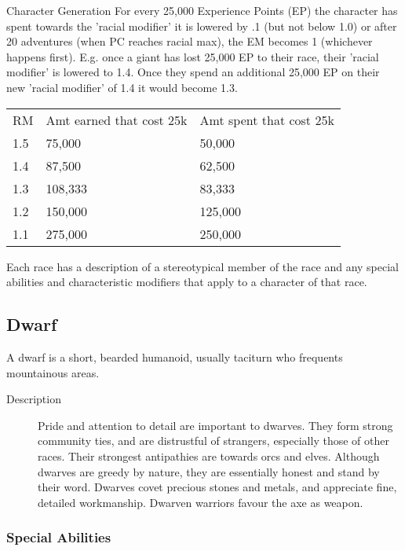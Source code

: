 \begin{Chapter}{Character Generation}
For every 25,000 Experience Points (EP) the character has spent
towards the 'racial modifier' it is lowered by .1 (but not below 1.0)
or after 20 adventures (when PC reaches racial max), the EM becomes 1
(whichever happens first).  E.g. once a giant has lost 25,000 EP to
their race, their 'racial modifier' is lowered to 1.4.  Once they
spend an additional 25,000 EP on their new 'racial modifier' of 1.4 it
would become 1.3.

\begin{tabularx}{\columnwidth}{lXX}
RM	& Amt earned that cost 25k	& Amt spent that cost 25k  \\
1.5	& 75,000			& 50,000 \\
1.4	& 87,500			& 62,500 \\
1.3	& 108,333			& 83,333 \\
1.2	& 150,000			& 125,000 \\
1.1	& 275,000			& 250,000 \\
\end{tabularx}

Each race has a description of a stereotypical member of the race and
any special abilities and characteristic modifiers that apply to a
character of that race.

\subsection{Dwarf}

A dwarf is a short, bearded humanoid, usually taciturn who frequents
mountainous areas.

\begin{description}
\item[Description] Pride and attention to detail are important to
  dwarves.  They form strong community ties, and are distrustful of
  strangers, especially those of other races. Their strongest
  antipathies are towards orcs and elves.  Although dwarves are greedy
  by nature, they are essentially honest and stand by their word.
  Dwarves covet precious stones and metals, and appreciate fine,
  detailed workmanship.  Dwarven warriors favour the axe as weapon.
\end{description}

\subsubsection{Special Abilities}

\begin{enumerate}


\end{enumerate}
\end{Chapter}
